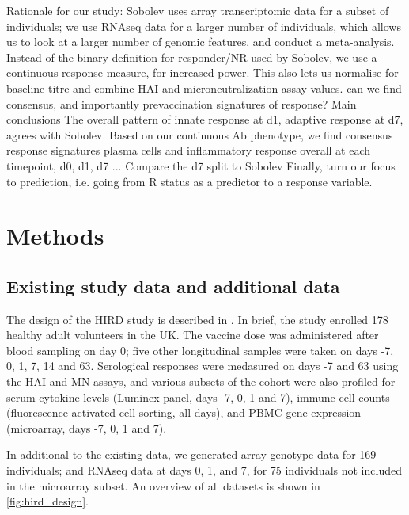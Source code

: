 \begin{outline}

    \1 Rationale for our study:
        \2 Sobolev uses array transcriptomic data for a subset of individuals; we use RNAseq data for a larger number of individuals, which allows us to look at a larger number of genomic features, and conduct a meta-analysis.
        \2 Instead of the binary definition for responder/NR used by Sobolev, we use a continuous response measure, for increased power. This also lets us normalise for baseline titre and combine HAI and microneutralization assay values.
            \3 can we find consensus, and importantly prevaccination signatures of response?
    \1 Main conclusions
        \2 The overall pattern of innate response at d1, adaptive response at d7, agrees with Sobolev.
        \2 Based on our continuous Ab phenotype, we find consensus response signatures
            \3 plasma cells and inflammatory response overall
            \3 at each timepoint, d0, d1, d7 ... 
                \4 Compare the d7 split to Sobolev 
    \1 Finally, turn our focus to prediction, i.e. going from R status as a predictor to a response variable.

\end{outline}

\section{Methods}

\subsection{Existing  study data and additional data}

The design of the \gls{HIRD} study is described in \autocite{sobolev2016AdjuvantedInfluenzaH1N1Vaccination}.
In brief, the study enrolled 178 healthy adult volunteers in the UK.
The vaccine dose was administered after blood sampling on day 0; five other longitudinal samples were taken on days -7, 0, 1, 7, 14 and 63.
Serological responses were medasured on days -7 and 63 using the \gls{HAI} and \gls{MN} assays, and various subsets of the cohort were also profiled for serum cytokine levels (Luminex panel, days -7, 0, 1 and 7), immune cell counts (fluorescence-activated cell sorting, all days), and \gls{PBMC} gene expression (microarray, days -7, 0, 1 and 7).

In additional to the existing data, we generated array genotype data for 169 individuals; and \gls{RNAseq} data at days 0, 1, and 7, for 75 individuals not included in the microarray subset.
An overview of all datasets is shown in \autoref{fig:hird_design}.


